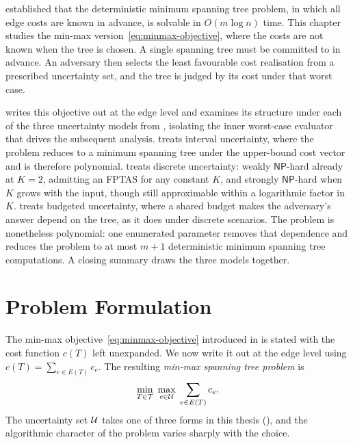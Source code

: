  established that the deterministic minimum spanning tree problem, in which all edge costs are known in advance, is solvable in $O(m \log n)$ time.
This chapter studies the min-max version~\eqref{eq:minmax-objective}, where the costs are not known when the tree is chosen. A single spanning tree must be committed to in advance. An adversary then selects the least favourable cost realisation from a prescribed uncertainty set, and the tree is judged by its cost under that worst case.

 writes this objective out at the edge level and examines its structure under each of the three uncertainty models from , isolating the inner worst-case evaluator that drives the subsequent analysis.
 treats interval uncertainty, where the problem reduces to a minimum spanning tree under the upper-bound cost vector and is therefore polynomial.
 treats discrete uncertainty: weakly $\mathsf{NP}$-hard already at $K = 2$, admitting an FPTAS for any constant $K$, and strongly $\mathsf{NP}$-hard when $K$ grows with the input, though still approximable within a logarithmic factor in $K$.
 treats budgeted uncertainty, where a shared budget makes the adversary's answer depend on the tree, as it does under discrete scenarios.
The problem is nonetheless polynomial: one enumerated parameter removes that dependence and reduces the problem to at most $m + 1$ deterministic minimum spanning tree computations.
A closing summary draws the three models together.

\section{Problem Formulation}\label{sec:mm-formulation}

The min-max objective~\eqref{eq:minmax-objective} introduced in  is stated with the cost function $c(T)$ left unexpanded.
We now write it out at the edge level using $c(T) = \sum_{e \in E(T)} c_e$.
The resulting \emph{\textcolor{RWTHBlue}{min-max spanning tree problem}} is
\begin{equation}\label{eq:mm-objective}
\min_{T \in \mathcal{T}}\; \max_{c \in \mathcal{U}}\; \sum_{e \in E(T)} c_e.
\end{equation}
The uncertainty set $\mathcal{U}$ takes one of three forms in this thesis (), and the algorithmic character of the problem varies sharply with the choice.

